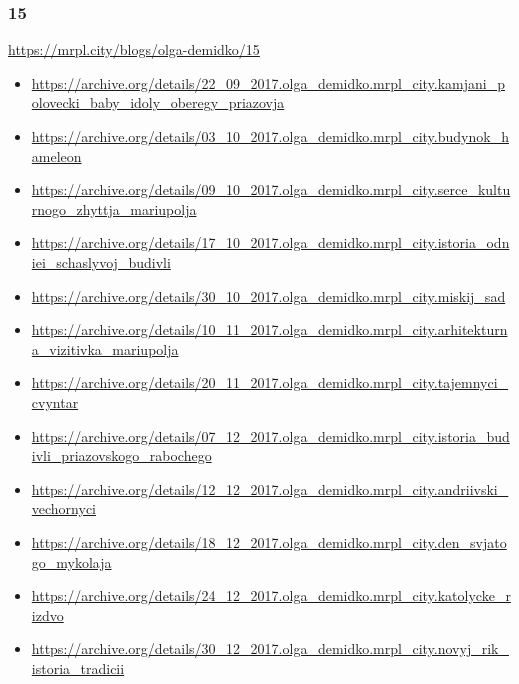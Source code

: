  
 
 
 
 

\subsubsection{15}

\begingroup

\url{https://mrpl.city/blogs/olga-demidko/15}

\begin{itemize}
  \small
  \item \url{https://archive.org/details/22_09_2017.olga_demidko.mrpl_city.kamjani_polovecki_baby_idoly_oberegy_priazovja}
  \item \url{https://archive.org/details/03_10_2017.olga_demidko.mrpl_city.budynok_hameleon}
  \item \url{https://archive.org/details/09_10_2017.olga_demidko.mrpl_city.serce_kulturnogo_zhyttja_mariupolja}
  \item \url{https://archive.org/details/17_10_2017.olga_demidko.mrpl_city.istoria_odniei_schaslyvoj_budivli}

  \item \url{https://archive.org/details/30_10_2017.olga_demidko.mrpl_city.miskij_sad}
  \item \url{https://archive.org/details/10_11_2017.olga_demidko.mrpl_city.arhitekturna_vizitivka_mariupolja}
  \item \url{https://archive.org/details/20_11_2017.olga_demidko.mrpl_city.tajemnyci_cvyntar}
  \item \url{https://archive.org/details/07_12_2017.olga_demidko.mrpl_city.istoria_budivli_priazovskogo_rabochego}

  \item \url{https://archive.org/details/12_12_2017.olga_demidko.mrpl_city.andriivski_vechornyci}
  \item \url{https://archive.org/details/18_12_2017.olga_demidko.mrpl_city.den_svjatogo_mykolaja}
  \item \url{https://archive.org/details/24_12_2017.olga_demidko.mrpl_city.katolycke_rizdvo}
  \item \url{https://archive.org/details/30_12_2017.olga_demidko.mrpl_city.novyj_rik_istoria_tradicii}
\end{itemize}

	
\endgroup
